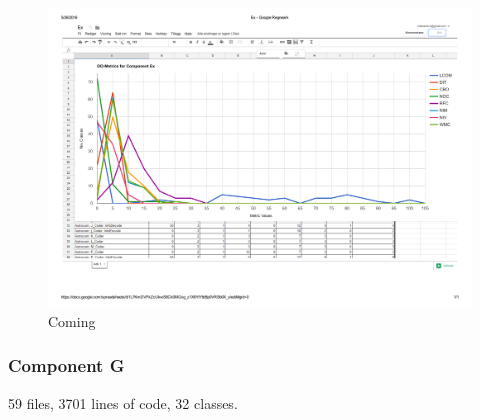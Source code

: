 \begin{landscape}
\setlength\LTleft{-.5in}
	\begin{figure}
	\label{fig:exgraph}
	\caption{Coming}
	\centering
	\includegraphics[width=\textwidth]{images/ex.pdf}
	\end{figure}
\end{landscape}







\subsubsection{Component G}
59 files, 3701 lines of code, 32 classes.


